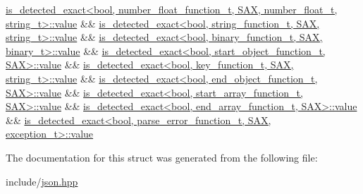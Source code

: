 \begin{DoxyCode}
      \hyperlink{namespacenlohmann_1_1detail_a2fb6dae6578e06ae73ca0d7cc8512b1aa2063c1608d6e0baf80249c42e2be5804}{is\_detected\_exact<bool, number\_float\_function\_t, SAX, number\_float\_t, string\_t>::value}
       &&
        \hyperlink{namespacenlohmann_1_1detail_a2fb6dae6578e06ae73ca0d7cc8512b1aa2063c1608d6e0baf80249c42e2be5804}{is\_detected\_exact<bool, string\_function\_t, SAX, string\_t>::value}
       &&
        \hyperlink{namespacenlohmann_1_1detail_a2fb6dae6578e06ae73ca0d7cc8512b1aa2063c1608d6e0baf80249c42e2be5804}{is\_detected\_exact<bool, binary\_function\_t, SAX, binary\_t>::value}
       &&
        \hyperlink{namespacenlohmann_1_1detail_a2fb6dae6578e06ae73ca0d7cc8512b1aa2063c1608d6e0baf80249c42e2be5804}{is\_detected\_exact<bool, start\_object\_function\_t, SAX>::value}
       &&
        \hyperlink{namespacenlohmann_1_1detail_a2fb6dae6578e06ae73ca0d7cc8512b1aa2063c1608d6e0baf80249c42e2be5804}{is\_detected\_exact<bool, key\_function\_t, SAX, string\_t>::value}
       &&
        \hyperlink{namespacenlohmann_1_1detail_a2fb6dae6578e06ae73ca0d7cc8512b1aa2063c1608d6e0baf80249c42e2be5804}{is\_detected\_exact<bool, end\_object\_function\_t, SAX>::value}
       &&
        \hyperlink{namespacenlohmann_1_1detail_a2fb6dae6578e06ae73ca0d7cc8512b1aa2063c1608d6e0baf80249c42e2be5804}{is\_detected\_exact<bool, start\_array\_function\_t, SAX>::value}
       &&
        \hyperlink{namespacenlohmann_1_1detail_a2fb6dae6578e06ae73ca0d7cc8512b1aa2063c1608d6e0baf80249c42e2be5804}{is\_detected\_exact<bool, end\_array\_function\_t, SAX>::value}
       &&
        \hyperlink{namespacenlohmann_1_1detail_a2fb6dae6578e06ae73ca0d7cc8512b1aa2063c1608d6e0baf80249c42e2be5804}{is\_detected\_exact<bool, parse\_error\_function\_t, SAX, exception\_t>::value}
\end{DoxyCode}


The documentation for this struct was generated from the following file\+:\begin{DoxyCompactItemize}
\item 
include/\hyperlink{json_8hpp}{json.\+hpp}\end{DoxyCompactItemize}
